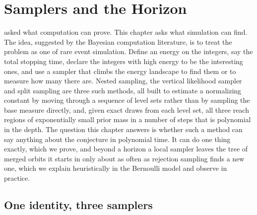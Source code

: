 \chapter{Samplers and the Horizon}\label{chap:samplers}

 asked what computation can prove. This chapter asks what
simulation can find. The idea, suggested by the Bayesian computation
literature, is to treat the problem as one of rare event simulation. Define an energy on
the integers, say the total stopping time, declare the integers with high energy to
be the interesting ones, and use a sampler that climbs the energy landscape to
find them or to measure how many there are. Nested sampling, the vertical
likelihood sampler and split sampling are three such methods, all built to
estimate a normalizing constant by moving through a sequence of level sets
rather than by sampling the base measure directly, and, given exact draws from each level set, all three
reach regions of exponentially small prior mass in a number of steps that is
polynomial in the depth. The question this chapter answers is whether such a
method can say anything about the conjecture in polynomial time. It can do one
thing exactly, which we prove, and beyond a horizon a local sampler leaves the tree of merged orbits it starts in only about as often as rejection sampling finds a new one, which we explain heuristically in the Bernoulli model and observe in practice.

\section{One identity, three samplers}

